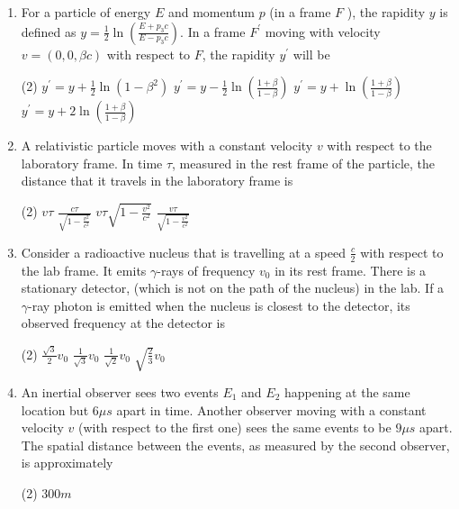 \begin{enumerate}
	\item For a particle of energy $E$ and momentum $p$ (in a frame $F$ ), the rapidity $y$ is defined as $y=\frac{1}{2} \ln \left(\frac{E+p_{3} c}{E-p_{3} c}\right) .$ In a frame $F^{\prime}$ moving with velocity $v=(0,0, \beta c)$ with respect to $F$, the rapidity $y^{\prime}$ will be
	{}
\begin{tasks}(2)
	\task[\textbf{A.}] $y^{\prime}=y+\frac{1}{2} \ln \left(1-\beta^{2}\right)$
	\task[\textbf{B.}]$y^{\prime}=y-\frac{1}{2} \ln \left(\frac{1+\beta}{1-\beta}\right)$
	\task[\textbf{C.}]$y^{\prime}=y+\ln \left(\frac{1+\beta}{1-\beta}\right)$
	\task[\textbf{D.}]$y^{\prime}=y+2 \ln \left(\frac{1+\beta}{1-\beta}\right)$
\end{tasks}
	\item A relativistic particle moves with a constant velocity $v$ with respect to the laboratory frame. In time $\tau$, measured in the rest frame of the particle, the distance that it travels in the laboratory frame is
	{}
\begin{tasks}(2)
	\task[\textbf{A.}] $v \tau$
	\task[\textbf{B.}]$\frac{c \tau}{\sqrt{1-\frac{v^{2}}{c^{2}}}}$
	\task[\textbf{C.}]$v \tau \sqrt{1-\frac{v^{2}}{c^{2}}}$
	\task[\textbf{D.}]$\frac{v \tau}{\sqrt{1-\frac{v^{2}}{c^{2}}}}$
\end{tasks}
	\item Consider a radioactive nucleus that is travelling at a speed $\frac{c}{2}$ with respect to the lab frame. It emits $\gamma$-rays of frequency $v_{0}$ in its rest frame. There is a stationary detector, (which is not on the path of the nucleus) in the lab. If a $\gamma$-ray photon is emitted when the nucleus is closest to the detector, its observed frequency at the detector is
	{}
\begin{tasks}(2)
	\task[\textbf{A.}] $\frac{\sqrt{3}}{2} v_{0}$
	\task[\textbf{B.}]$\frac{1}{\sqrt{3}} v_{0}$
	\task[\textbf{C.}]$\frac{1}{\sqrt{2}} v_{0}$
	\task[\textbf{D.}]$\sqrt{\frac{2}{3}} v_{0}$
\end{tasks}
	\item An inertial observer sees two events $E_{1}$ and $E_{2}$ happening at the same location but $6 \mu s$ apart in time. Another observer moving with a constant velocity $v$ (with respect to the first one) sees the same events to be $9 \mu s$ apart. The spatial distance between the events, as measured by the second observer, is approximately
{	}
\begin{tasks}(2)
	\task[\textbf{A.}] $300 m$

\end{tasks}
\end{enumerate}
